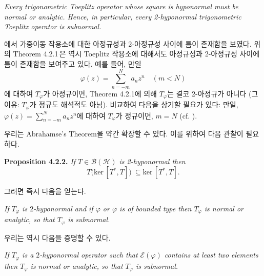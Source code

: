 \documentclass[12pt,a4paper,2sided]{article}
\begin{document}
\vspace{.2 cm}{\bf Theorem 4.2.1.} {\rm \cite{CuL1}}  {\sl Every
trigonometric Toeplitz operator whose square is hyponormal must be
normal or analytic. Hence, in particular, every 2-hyponormal
trigonometric Toeplitz operator is subnormal.}

\vspace{.2 cm} \cite{Cu1}에서 가중이동 작용소에 대한 아정규성과
2-아정규성 사이에 틈이 존재함을 보였다. 위의 Theorem 4.2.1\,은 역시
Toeplitz 작용소에 대해서도  아정규성과 2-아정규성 사이에 틈이
존재함을 보여주고 있다. 예를 들어, 만일
$$
\varphi(z)=\sum_{n=-m}^N a_n z^n\quad (m<N)
$$
에 대하여 $T_\varphi$가 아정규이면, Theorem 4.2.1에 의해
$T_\varphi$는 결코 2-아정규가 아니다 (그 이유: $T_\varphi$가 정규도
해석적도 아님). 비교하여 다음을 상기할 필요가 있다: 만일,
$\varphi(z)=\sum_{n=-m}^N a_n z^n$에 대하여 $T_\varphi$가 정규이면,
$m=N$ (cf. \cite{FL1}).

\vspace{.2 cm} 우리는 Abrahamse's Theorem을 약간 확장할 수 있다.
이를 위하여 다음 관찰이 필요하다.


\newpage{}

\vspace{.8 cm}

{\bf Proposition 4.2.2.} {\rm \cite{CuL2}} {\sl If
$T\in\mathcal{B(H)}$ is 2-hyponormal then
\begin{equation}\label{4.2.1}
T\bigl(\text{ker}\,[T^*,T]\bigr)\ \subseteq \text{ker}\,[T^*,T].
\end{equation}}

그러면  즉시 다음을 얻는다.

\vspace{.2 cm}{\bf Corollary 4.2.3.} {\sl If $T_\varphi$ is
$2$-hyponormal and if $\varphi$ or $\bar\varphi$ is of bounded type
then $T_\varphi$ is normal or analytic, so that $T_\varphi$ is
subnormal.}  \vspace{.2 cm}

우리는 역시 다음을 증명할 수 있다.

\vspace{.2 cm}{\bf Corollary 4.2.4.} {\sl If $T_\varphi$ is a
$2$-hyponormal operator such that $\mathcal{E}(\varphi)$ contains at
least two elements then $T_\varphi$ is normal or analytic, so that
$T_\varphi$ is subnormal.}
\vspace{.2 cm}
\end{document}
